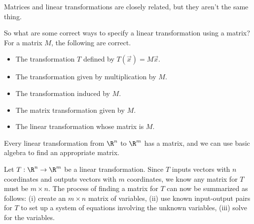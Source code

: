 \begin{emphbox}[Takeaway]
	Matrices and linear transformations are closely related, but they aren't the same thing.
\end{emphbox}

So what are some correct ways to specify a linear transformation using a matrix? 
For a matrix $M$, the following are correct.
\begin{itemize}
	\item The transformation $T$ defined by $T(\vec x)=M\vec x$.
	\item The transformation given by multiplication by $M$.
	\item The transformation induced by $M$.
	\item The matrix transformation given by $M$.
	\item The linear transformation whose matrix is $M$.
\end{itemize}


Every linear transformation from $\R^n$ to $\R^m$ has a matrix, and we can use basic algebra to find
an appropriate matrix.

Let $T:\R^n\to\R^m$ be a linear transformation. Since $T$ inputs vectors with $n$ coordinates and outputs
vectors with $m$ coordinates, we know any matrix for $T$ must be $m\times n$. The process of finding
a matrix for $T$ can now be summarized as follows: (i) create an $m\times n$ matrix of variables, (ii) use
known input-output pairs for $T$ to set up a system of equations involving the unknown variables, (iii) solve
for the variables.


